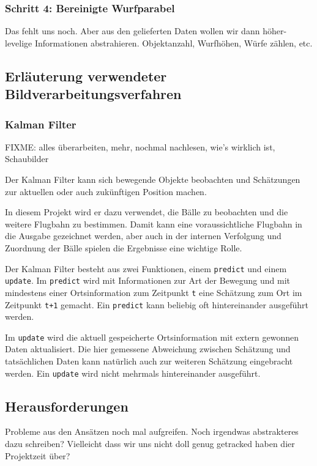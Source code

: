 \documentclass[12pt,a4paper,ngerman]{scrartcl}
\begin{document}
\subsubsection{Schritt 4: Bereinigte Wurfparabel}

Das fehlt uns noch. Aber aus den gelieferten Daten wollen wir dann höher-levelige Informationen abstrahieren. Objektanzahl, Wurfhöhen, Würfe zählen, etc.

\subsection{Erläuterung verwendeter Bildverarbeitungsverfahren}

\subsubsection{Kalman Filter}

{\color{red} FIXME: alles überarbeiten, mehr, nochmal nachlesen, wie's wirklich ist, Schaubilder}

Der Kalman Filter kann sich bewegende Objekte beobachten und Schätzungen zur aktuellen oder auch zukünftigen Position machen.

In diesem Projekt wird er dazu verwendet, die Bälle zu beobachten und die weitere Flugbahn zu bestimmen. Damit kann eine voraussichtliche Flugbahn in die Ausgabe gezeichnet werden, aber auch in der internen Verfolgung und Zuordnung der Bälle spielen die Ergebnisse eine wichtige Rolle.

Der Kalman Filter besteht aus zwei Funktionen, einem {\tt predict} und einem {\tt update}. Im {\tt predict} wird mit Informationen zur Art der Bewegung und mit mindestens einer Ortsinformation zum Zeitpunkt {\tt t} eine Schätzung zum Ort im Zeitpunkt {\tt t+1} gemacht. Ein {\tt predict} kann beliebig oft hintereinander ausgeführt werden.

Im {\tt update} wird die aktuell gespeicherte Ortsinformation mit extern gewonnen Daten aktualisiert. Die hier gemessene Abweichung zwischen Schätzung und tatsächlichen Daten kann natürlich auch zur weiteren Schätzung eingebracht werden. Ein {\tt update} wird nicht mehrmals hintereinander ausgeführt.

\subsection{Herausforderungen}

Probleme aus den Ansätzen noch mal aufgreifen. Noch irgendwas abstrakteres dazu schreiben? Vielleicht dass wir uns nicht doll genug getracked haben dier Projektzeit über?
\end{document}
